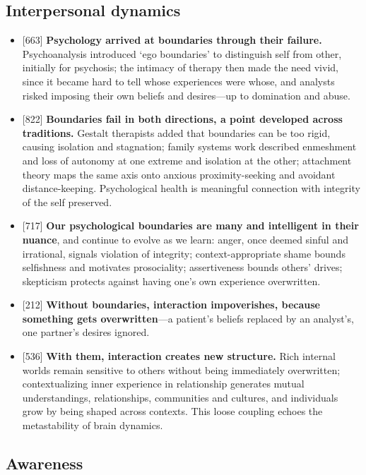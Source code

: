 \documentclass[11pt]{article}
\newcommand{\ct}[1]{{\footnotesize\color{black!55}[#1]}\hspace{1pt}}
\begin{document}
\subsection{Interpersonal dynamics}

\begin{itemize}
  \item \ct{663} \textbf{Psychology arrived at boundaries through their failure.} Psychoanalysis introduced `ego boundaries' to distinguish self from other, initially for psychosis; the intimacy of therapy then made the need vivid, since it became hard to tell whose experiences were whose, and analysts risked imposing their own beliefs and desires---up to domination and abuse.
  \item \ct{822} \textbf{Boundaries fail in both directions, a point developed across traditions.} Gestalt therapists added that boundaries can be too rigid, causing isolation and stagnation; family systems work described enmeshment and loss of autonomy at one extreme and isolation at the other; attachment theory maps the same axis onto anxious proximity-seeking and avoidant distance-keeping. Psychological health is meaningful connection with integrity of the self preserved.
  \item \ct{717} \textbf{Our psychological boundaries are many and intelligent in their nuance}, and continue to evolve as we learn: anger, once deemed sinful and irrational, signals violation of integrity; context-appropriate shame bounds selfishness and motivates prosociality; assertiveness bounds others' drives; skepticism protects against having one's own experience overwritten.
  \item \ct{212} \textbf{Without boundaries, interaction impoverishes, because something gets overwritten}---a patient's beliefs replaced by an analyst's, one partner's desires ignored.
  \item \ct{536} \textbf{With them, interaction creates new structure.} Rich internal worlds remain sensitive to others without being immediately overwritten; contextualizing inner experience in relationship generates mutual understandings, relationships, communities and cultures, and individuals grow by being shaped across contexts. This loose coupling echoes the metastability of brain dynamics.
\end{itemize}

\subsection{Awareness}
\end{document}
